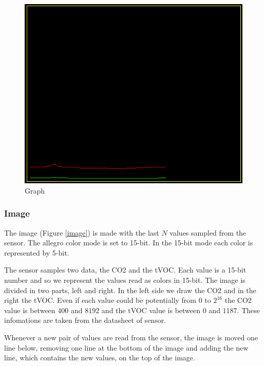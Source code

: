 \documentclass[12pt]{article}
\begin{document}
\begin{figure}[H]
    \centering
    \includegraphics[scale=0.60]{images/graph.png}
    \caption{Graph }
    \label{graph}
\end{figure}

\subsubsection*{Image}
The image (Figure \ref{image}) is made with the last $N$ values sampled from
the sensor. The allegro color mode is set to 15-bit. In the 15-bit mode each
color is represented by 5-bit.

The sensor samples two data, the CO2 and the tVOC. Each value is a 15-bit
number and so we represent the values read as colors in 15-bit. The image
is divided in two parts, left and right. In the left side we draw the CO2
and in the right the tVOC. Even if each value could be potentially from $0$ to 
$2^{16}$ the CO2 value is between $400$ and $8192$ and the tVOC value is between
$0$ and $1187$. These infomations are taken from the datasheet of sensor.

Whenever a new pair of values are read from the sensor, the image is moved
one line below, removing one line at the bottom of the image and adding the
new line, which contains the new values, on the top of the image.
\end{document}
